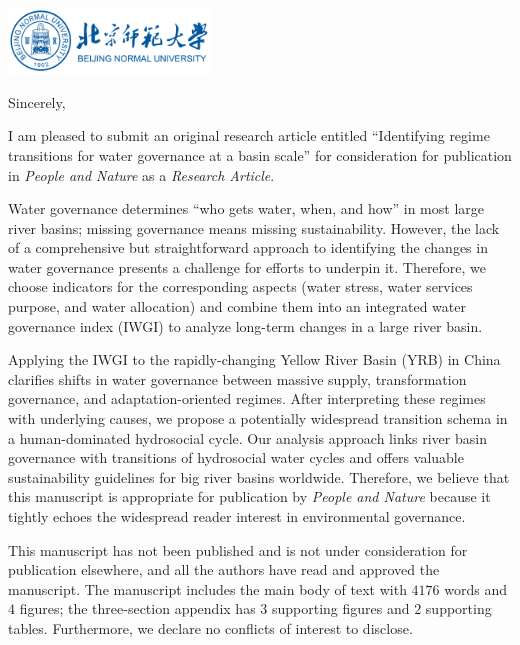 \documentclass[11pt,a4paper,roman]{moderncv}
\begin{document}
\begin{minipage}[t]{\textwidth}
\includegraphics[width=0.40\textwidth]{bnu}
\end{minipage}


\opening{\vspace*{-2em}}
\closing{Sincerely,}{\vspace*{-2em}}
\makelettertitle

I am pleased to submit an original research article entitled ``Identifying regime transitions for water governance at a basin scale'' for consideration for publication in \textit{People and Nature} as a \textit{Research Article}.

Water governance determines ``who gets water, when, and how'' in most large river basins; missing governance means missing sustainability. However, the lack of a comprehensive but straightforward approach to identifying the changes in water governance presents a challenge for efforts to underpin it. Therefore, we choose indicators for the corresponding aspects (water stress, water services purpose, and water allocation) and combine them into an integrated water governance index (IWGI) to analyze long-term changes in a large river basin.

Applying the IWGI to the rapidly-changing Yellow River Basin (YRB) in China clarifies shifts in water governance between massive supply, transformation governance, and adaptation-oriented regimes. After interpreting these regimes with underlying causes, we propose a potentially widespread transition schema in a human-dominated hydrosocial cycle. Our analysis approach links river basin governance with transitions of hydrosocial water cycles and offers valuable sustainability guidelines for big river basins worldwide. Therefore, we believe that this manuscript is appropriate for publication by \textit{People and Nature} because it tightly echoes the widespread reader interest in environmental governance.

This manuscript has not been published and is not under consideration for publication elsewhere, and all the authors have read and approved the manuscript. The manuscript includes the main body of text with $4176$ words and $4$ figures; the three-section appendix has $3$ supporting figures and $2$ supporting tables. Furthermore, we declare no conflicts of interest to disclose.
\end{document}

